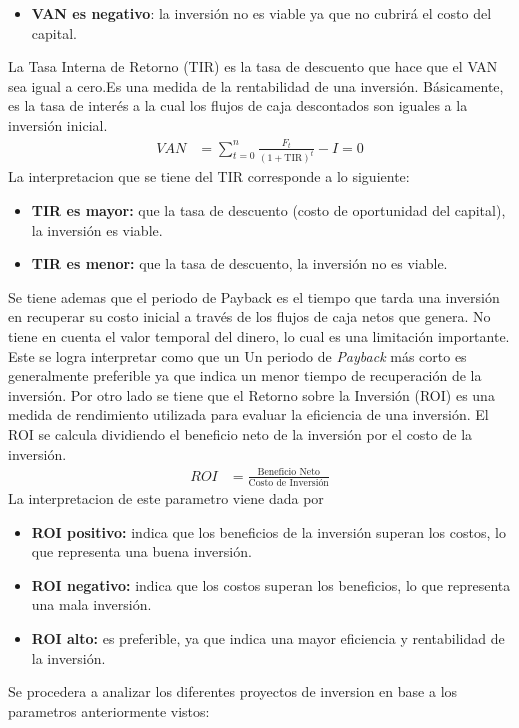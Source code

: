 \begin{itemize}
\begin{itemize}
	    \item \textbf{VAN es negativo}: la inversión no es viable ya que no cubrirá el costo del capital.
	\end{itemize}
	La Tasa Interna de Retorno (TIR) es la tasa de descuento que hace que el VAN sea igual a cero.Es una medida de la rentabilidad de una inversión. Básicamente, es la tasa de interés a la cual los flujos de caja descontados son iguales a la inversión inicial.
	\begin{align}
		VAN &= \sum_{t=0}^{n} \frac{F_t}{(1+\text{TIR})^t} - I = 0
	\end{align}
	La interpretacion que se tiene del TIR corresponde a lo siguiente:
	\begin{itemize}
    	\item \textbf{TIR es mayor:} que la tasa de descuento (costo de oportunidad del capital), la inversión es viable.
	    \item \textbf{TIR es menor:} que la tasa de descuento, la inversión no es viable.
	\end{itemize}
	Se tiene ademas que el periodo de Payback es el tiempo que tarda una inversión en recuperar su costo inicial a través de los flujos de caja netos que genera.  No tiene en cuenta el valor temporal del dinero, lo cual es una limitación importante. Este se logra interpretar como que un Un periodo de \textit{Payback} más corto es generalmente preferible ya que indica un menor tiempo de recuperación de la inversión. Por otro lado se tiene que el Retorno sobre la Inversión (ROI) es una medida de rendimiento utilizada para evaluar la eficiencia de una inversión. El ROI se calcula dividiendo el beneficio neto de la inversión por el costo de la inversión.
	\begin{align}
		ROI &= \frac{\text{Beneficio Neto}}{\text{Costo de Inversión}}
	\end{align}
	La interpretacion de este parametro viene dada por 
	\begin{itemize}
    	\item \textbf{ROI positivo:} indica que los beneficios de la inversión superan los costos, lo que representa una buena inversión.
    	\item \textbf{ROI negativo:} indica que los costos superan los beneficios, lo que representa una mala inversión.
    	\item \textbf{ROI alto:} es preferible, ya que indica una mayor eficiencia y rentabilidad de la inversión.
	\end{itemize}
	Se procedera a analizar los diferentes proyectos de inversion en base a los parametros anteriormente vistos:


\end{itemize}
